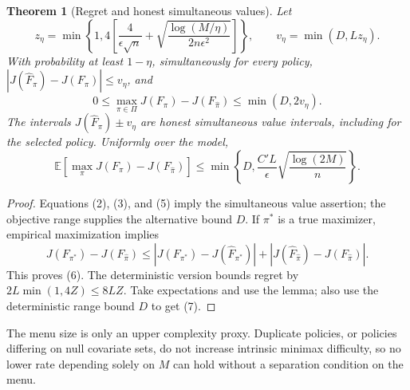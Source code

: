 \documentclass[11pt]{article}
\newtheorem{theorem}{Theorem}
\theoremstyle{remark}
\newcommand{\E}{\mathbb E}
\begin{document}
\begin{theorem}[Regret and honest simultaneous values]
Let
\[
 z_\eta=\min\left\{1,4\left[
  \frac4{\epsilon\sqrt n}
  +\sqrt{\frac{\log(M/\eta)}{2n\epsilon^2}}\right]\right\},
 \qquad v_\eta=\min(D,Lz_\eta).
\]
With probability at least $1-\eta$, simultaneously for every policy,
$|J(\widehat F_\pi)-J(F_\pi)|\leq v_\eta$, and
\[
 0\leq\max_{\pi\in\Pi}J(F_\pi)-J(F_{\widehat\pi})
       \leq\min(D,2v_\eta). \tag{6}
\]
The intervals $J(\widehat F_\pi)\pm v_\eta$ are honest simultaneous value
intervals, including for the selected policy. Uniformly over the model,
\[
 \E\left[\max_\pi J(F_\pi)-J(F_{\widehat\pi})\right]
 \leq\min\left\{D,\frac{C'L}{\epsilon}
                        \sqrt{\frac{\log(2M)}n}\right\}. \tag{7}
\]
\end{theorem}
\begin{proof}
Equations (2), (3), and (5) imply the simultaneous value assertion; the
objective range supplies the alternative bound $D$. If $\pi^*$ is a
true maximizer, empirical maximization implies
\[
 J(F_{\pi^*})-J(F_{\widehat\pi})
 \leq |J(F_{\pi^*})-J(\widehat F_{\pi^*})|
       +|J(\widehat F_{\widehat\pi})-J(F_{\widehat\pi})|.
\]
This proves (6). The deterministic version bounds regret by
$2L\min(1,4Z)\leq8LZ$. Take expectations and use the lemma; also
use the deterministic range bound $D$ to get (7).
\end{proof}

The menu size is only an upper complexity proxy. Duplicate policies,
or policies differing on null covariate sets, do not increase intrinsic
minimax difficulty, so no lower rate depending solely on $M$ can hold
without a separation condition on the menu.
\end{document}

